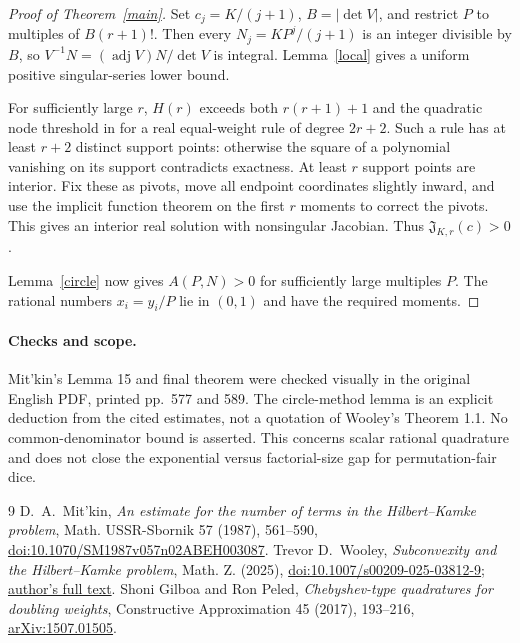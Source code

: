 \documentclass[11pt]{article}
\begin{document}
\begin{proof}[Proof of Theorem~\ref{main}]
Set $c_j=K/(j+1)$, $B=|\det V|$, and restrict $P$ to multiples of
$B(r+1)!$. Then every $N_j=KP^j/(j+1)$ is an integer divisible by $B$,
so $V^{-1}N=(\operatorname{adj}V)N/\det V$ is integral.
Lemma~\ref{local} gives a uniform positive singular-series lower bound.

For sufficiently large $r$, $H(r)$ exceeds both $r(r+1)+1$ and the
quadratic node threshold in \cite{gp} for a real equal-weight rule of
degree $2r+2$. Such a rule has at least $r+2$ distinct support points:
otherwise the square of a polynomial vanishing on its support contradicts
exactness. At least $r$ support points are interior. Fix these as pivots,
move all endpoint coordinates slightly inward, and use the implicit
function theorem on the first $r$ moments to correct the pivots. This
gives an interior real solution with nonsingular Jacobian.
Thus $\mathfrak J_{K,r}(c)>0$.

Lemma~\ref{circle} now gives $A(P,N)>0$ for sufficiently large multiples
$P$. The rational numbers $x_i=y_i/P$ lie in $(0,1)$ and have the required
moments.
\end{proof}

\paragraph{Checks and scope.}
Mit'kin's Lemma 15 and final theorem were checked visually in the
original English PDF, printed pp.~577 and 589. The circle-method lemma
is an explicit deduction from the cited estimates, not a quotation of
Wooley's Theorem 1.1. No common-denominator bound is asserted.
This concerns scalar rational quadrature and does not close the
exponential versus factorial-size gap for permutation-fair dice.

\begin{thebibliography}{9}
 D.~A.~Mit'kin, \emph{An estimate for the number of terms
in the Hilbert--Kamke problem}, Math. USSR-Sbornik 57 (1987), 561--590,
\href{https://doi.org/10.1070/SM1987v057n02ABEH003087}{doi:10.1070/SM1987v057n02ABEH003087}.
 Trevor D.~Wooley, \emph{Subconvexity and the
Hilbert--Kamke problem}, Math. Z. (2025),
\href{https://doi.org/10.1007/s00209-025-03812-9}{doi:10.1007/s00209-025-03812-9};
\href{https://www.math.purdue.edu/~twooley/publ/20211215hilkam.pdf}{author's full text}.
 Shoni Gilboa and Ron Peled, \emph{Chebyshev-type quadratures
for doubling weights}, Constructive Approximation 45 (2017), 193--216,
\href{https://arxiv.org/abs/1507.01505}{arXiv:1507.01505}.
\end{thebibliography}
\end{document}
